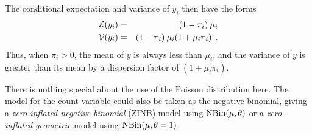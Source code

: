 \documentclass[11pt]{book}\usepackage[]{graphicx}\usepackage[]{color}
\begin{document}
The conditional expectation and variance of $y_i$ then have the forms
\begin{eqnarray*}
\mathcal{E} (y_i) &=& (1 - {\pi _i}) \: \mu_i  \\
\mathcal{V} (y_i) &=& (1 - {\pi _i}) \: \mu_i  (1 + \mu_i \pi_i ) \:\: .
\end{eqnarray*}
Thus, when $\pi_i > 0$, the mean of $y$ is always less than $\mu_i$,
and the variance of $y$ is greater than its mean by a dispersion factor of $(1 + \mu_i \pi_i)$.

There is nothing special about the use of the Poisson distribution here. The model for the
count variable could also be taken as the negative-binomial, giving a
\emph{zero-inflated negative-binomial} (ZINB) model using $\NBin (\mu, \theta)$ or
a \emph{zero-inflated geometric} model using $\NBin (\mu, \theta=1)$.
\end{document}

